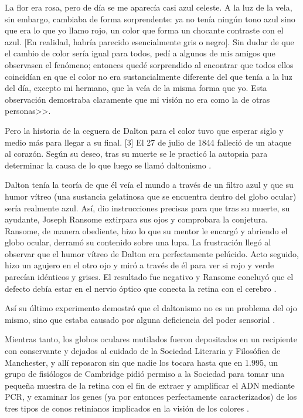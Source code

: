\documentclass[10pt]{article}
\begin{document}
\setlength{\parskip}{2mm}

La flor era rosa, pero de día se me aparecía casi azul celeste. A la luz de la vela, sin embargo, cambiaba de forma sorprendente: ya no tenía ningún tono azul sino que era lo que yo llamo rojo, un color que forma un chocante contraste con el azul. [En realidad, habría parecido esencialmente gris o negro]. Sin dudar de que el cambio de color sería igual para todos, pedí a algunos de mis amigos que observasen el fenómeno; entonces quedé sorprendido al encontrar que todos ellos coincidían en que el color no era sustancialmente diferente del que tenía a la luz del día, excepto mi hermano, que la veía de la misma forma que yo. Esta observación demostraba claramente que mi visión no era como la de otras personas>>\cite{IEEEreferencias:Ref3}.

\setlength{\parskip}{2mm}

Pero la historia de la ceguera de Dalton para el color tuvo que esperar siglo y medio más para llegar a su final. [3]
El 27 de julio de 1844 falleció de un ataque al corazón. Según su deseo, tras su muerte se le practicó la autopsia para determinar la causa de lo que luego se llamó daltonismo \cite{IEEEreferencias:Ref1}.

\setlength{\parskip}{2mm}

Dalton tenía la teoría de que él veía el mundo a través de un filtro azul y que su humor vítreo (una sustancia gelatinosa que se encuentra dentro del globo ocular) sería realmente azul. Así, dio instrucciones precisas para que tras su muerte, su ayudante, Joseph Ransome extirpara sus ojos y comprobara la conjetura. Ransome, de manera obediente, hizo lo que su mentor le encargó y abriendo el globo ocular, derramó su contenido sobre una lupa. La frustración llegó al observar que el humor vítreo de Dalton era perfectamente pelúcido. Acto seguido, hizo un agujero en el otro ojo y miró a través de él para ver si rojo y verde parecían idénticos y grises. El resultado fue negativo y Ransome concluyó que el defecto debía estar en el nervio óptico que conecta la retina con el cerebro \cite{IEEEreferencias:Ref3}.

\setlength{\parskip}{2mm}

Así su último experimento demostró que el daltonismo no es un problema del ojo mismo, sino que estaba causado por alguna deficiencia del poder sensorial \cite{IEEEreferencias:Ref1}.

\setlength{\parskip}{2mm}

Mientras tanto, los globos oculares mutilados fueron depositados en un recipiente con conservante y dejados al cuidado de la Sociedad Literaria y Filosófica de Manchester, y allí reposaron sin que nadie los tocara hasta que en 1.995, un grupo de fisiólogos de Cambridge pidió permiso a la Sociedad para tomar una pequeña muestra de la retina con el fin de extraer y amplificar el ADN mediante PCR, y examinar los genes (ya por entonces perfectamente caracterizados) de los tres tipos de conos retinianos implicados en la visión de los colores \cite{IEEEreferencias:Ref3}.
\end{document}
